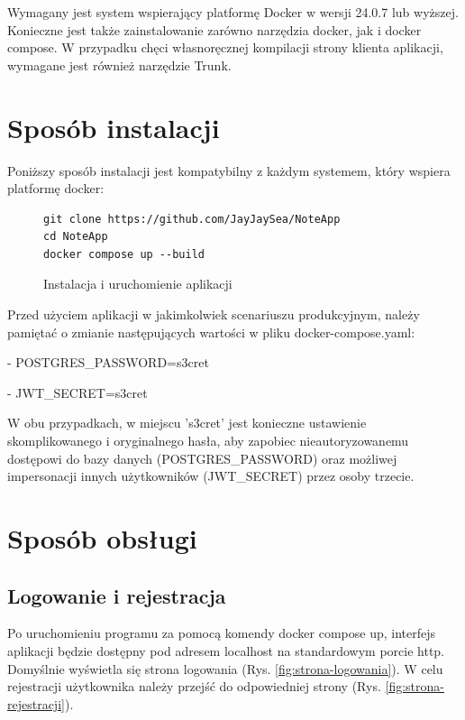\documentclass[a4paper,twoside,12pt]{book}
\begin{document}
Wymagany jest system wspierający platformę Docker w wersji 24.0.7 lub wyższej.
Konieczne jest także zainstalowanie zarówno narzędzia docker, jak i docker compose.
W przypadku chęci własnoręcznej kompilacji strony klienta aplikacji, wymagane jest również
narzędzie Trunk.

\section{Sposób instalacji}
\label{sec:instalacja}

Poniższy sposób instalacji jest kompatybilny z każdym systemem, który wspiera
platformę docker:

\begin{figure}[H]
\centering
\begin{lstlisting}
git clone https://github.com/JayJaySea/NoteApp
cd NoteApp
docker compose up --build
\end{lstlisting}
\caption{Instalacja i uruchomienie aplikacji}
\label{fig:app-install}
\end{figure}

Przed użyciem aplikacji w jakimkolwiek scenariuszu produkcyjnym,
należy pamiętać o zmianie następujących wartości w pliku docker-compose.yaml:
 
- POSTGRES\_PASSWORD=s3cret 

- JWT\_SECRET=s3cret 

W obu przypadkach, w miejscu 's3cret' jest konieczne ustawienie skomplikowanego
i oryginalnego hasła, aby zapobiec nieautoryzowanemu dostępowi do 
bazy danych (POSTGRES\_PASSWORD) oraz możliwej impersonacji innych użytkowników
(JWT\_SECRET) przez osoby trzecie.

\section{Sposób obsługi}

\subsection{Logowanie i rejestracja}
Po uruchomieniu programu za pomocą komendy docker compose up, interfejs
aplikacji będzie dostępny pod adresem localhost na standardowym porcie http.
Domyślnie wyświetla się strona logowania (Rys. \ref{fig:strona-logowania}).
W celu rejestracji użytkownika należy przejść do odpowiedniej strony (Rys. \ref{fig:strona-rejestracji}).
\end{document}
